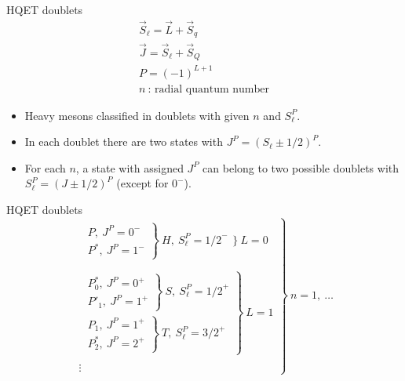 \documentclass[professionalfonts,aspectratio=169]{beamer}
\begin{document}
\begin{frame}{HQET doublets}
  \begin{equation*}
    \begin{array}{c}
      \vec{S}_\ell = \vec{L} + \vec{S}_q \\[10pt]
      \vec{J} = \vec{S}_\ell + \vec{S}_Q \\[10pt]
      P = (-1)^{L+1} \\[10pt]
      n \ \text{: radial quantum number}
    \end{array}
  \end{equation*}
  \begin{itemize}
    \pause
    \item
      Heavy mesons classified in doublets with given $n$ and $S^P_\ell$.
    \pause
    \item
       In each doublet there are two states with $J^P = \left( S_\ell \pm 1/2 \right)^P$.
    \pause
    \item
      For each $n$, a state with assigned $J^P$ can belong to two possible doublets with $S^P_\ell = \left( J \pm 1/2 \right)^P$ (except for $0^-$).
  \end{itemize}
\end{frame}

\begin{frame}{HQET doublets}
  \begin{equation*}
    \left.
    \begin{matrix}
      \begin{matrix}
        \left.
        \begin{matrix}
          P , \ J^P = 0^- \\
          P^* , \ J^P = 1^-
        \end{matrix}
        \right\} \ H, \ S^P_\ell = \left. 1/2 \right.^-
      \end{matrix}
      \Big\} \ L = 0 \\ \\
      \left.
      \begin{matrix}
        \left.
        \begin{matrix}
          P^*_0 , \ J^P = 0^+ \\
          P'_1 , \ J^P = 1^+
        \end{matrix}
        \right\} \ S, \ S^P_\ell = \left. 1/2 \right.^+ \\
        \left.
        \begin{matrix}
          P_1 , \ J^P = 1^+ \\
          P^*_2 , \ J^P = 2^+
        \end{matrix}
        \right\} \ T, \ S^P_\ell = \left. 3/2 \right.^+
      \end{matrix}
      \right\} \ L = 1 \\ \\
      \vdots
    \end{matrix}
    \right\} \ n = 1, \ \ldots
  \end{equation*}
\end{frame}
\end{document}
